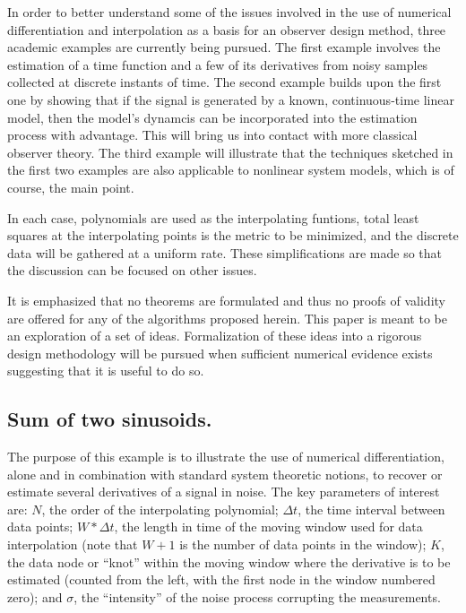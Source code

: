 In order to better understand some of the issues involved in the use of  
numerical differentiation and interpolation as a basis for an
observer design method, three academic
examples are currently being pursued.  The first example
involves the estimation
of a time function and a few of its derivatives from noisy samples collected at
discrete instants of time.  The second example builds upon the first one
by showing that if the signal is generated by a known,
continuous-time linear model,
then the model's dynamcis can be incorporated into the estimation
process with advantage.  This will bring us into contact with more classical observer
theory.  The third example will illustrate that the techniques sketched in the
first two examples are
also applicable to nonlinear system models, which is of course, the main
point.


In each case, polynomials are used as the interpolating
funtions, total least squares at the interpolating points is the 
metric to be minimized, and the discrete data will be gathered at a uniform rate.
These simplifications are made so that the discussion can be focused on other issues.

It is emphasized that no theorems are formulated and thus no proofs of validity
are
offered for any of the algorithms proposed herein.  This paper is meant to be an
exploration of a set of ideas.  Formalization of these ideas into a rigorous design
methodology will be pursued when sufficient numerical evidence exists suggesting that
it is useful to do so.  

\subsection{Sum of two sinusoids.}

The purpose of this example is to illustrate the use of numerical
differentiation, alone and 
in combination with standard system theoretic notions,
to recover or estimate several derivatives of a signal in noise.  The key
parameters of interest are: $N$, the order of the interpolating polynomial;
$\Delta t$, the time interval between data points;
$W * \Delta t$, the length in time of the moving window used for data interpolation
(note that $W + 1$ is the number of data points in the window);
$K$, the data node or ``knot'' within the moving window 
where the derivative is to be estimated (counted from the left, with
the first node in the window numbered zero); and $\sigma$, the ``intensity'' 
of the noise process corrupting the measurements.

